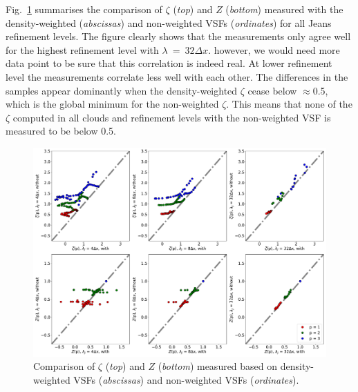 Fig.~\ref{pic:results:comp_weighting} summarises the comparison of $\zeta$ (\textit{top}) and $Z$ (\textit{bottom}) measured with the density-weighted (\textit{abscissas}) and non-weighted VSFs (\textit{ordinates}) for all Jeans refinement levels.
The figure clearly shows that the measurements only agree well for the highest refinement level with $\lambda~=~32\Delta x$.
however, we would need more data point to be sure that this correlation is indeed real.
At lower refinement level the measurements correlate less well with each other. 
The differences in the samples appear dominantly when the density-weighted $\zeta$ cease below $\approx$0.5, which is the global minimum for the non-weighted $\zeta$. 
This means that none of the $\zeta$ computed in all clouds and refinement levels with the non-weighted VSF is measured to be below 0.5. 

\begin{figure}
	\centering
    \includegraphics[width=\textwidth]{comp_weighting.pdf}
    \caption{ Comparison of $\zeta$ (\textit{top}) and $Z$ (\textit{bottom}) measured based on density-weighted VSFs (\textit{abscissas}) and non-weighted VSFs (\textit{ordinates}). }
    \label{pic:results:comp_weighting}
\end{figure}
